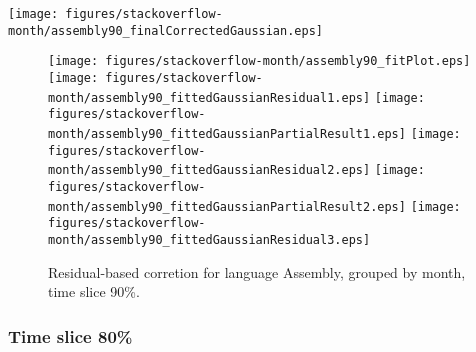 \begin{center}
{\texttt{[image: figures/stackoverflow-month/assembly90\_finalCorrectedGaussian.eps]}}
\end{center}

\FloatBarrier

\begin{figure}[t]
\centering
{}
{\texttt{[image: figures/stackoverflow-month/assembly90\_fitPlot.eps]}}
{\texttt{[image: figures/stackoverflow-month/assembly90\_fittedGaussianResidual1.eps]}}
{\texttt{[image: figures/stackoverflow-month/assembly90\_fittedGaussianPartialResult1.eps]}}
{\texttt{[image: figures/stackoverflow-month/assembly90\_fittedGaussianResidual2.eps]}}
{\texttt{[image: figures/stackoverflow-month/assembly90\_fittedGaussianPartialResult2.eps]}}
{\texttt{[image: figures/stackoverflow-month/assembly90\_fittedGaussianResidual3.eps]}}
\caption{Residual-based corretion for language Assembly, grouped by month, time slice 90\%.}
\end{figure}


\FloatBarrier


\subsubsection{Time slice 80\%}

